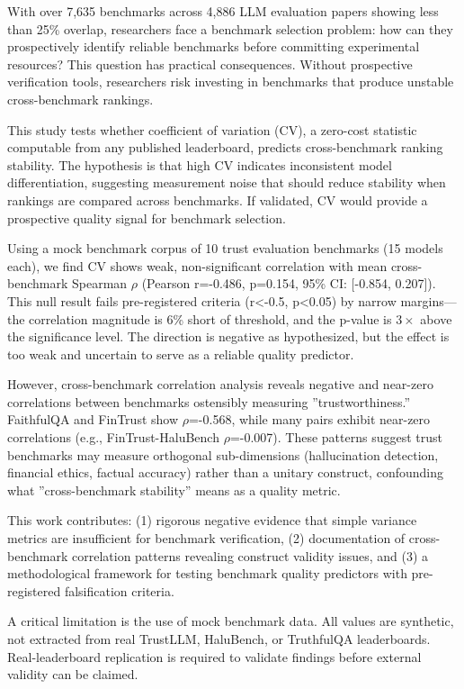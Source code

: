 
With over 7,635 benchmarks across 4,886 LLM evaluation papers showing less than 25\% overlap, researchers face a benchmark selection problem: how can they prospectively identify reliable benchmarks before committing experimental resources? This question has practical consequences. Without prospective verification tools, researchers risk investing in benchmarks that produce unstable cross-benchmark rankings.

This study tests whether coefficient of variation (CV), a zero-cost statistic computable from any published leaderboard, predicts cross-benchmark ranking stability. The hypothesis is that high CV indicates inconsistent model differentiation, suggesting measurement noise that should reduce stability when rankings are compared across benchmarks. If validated, CV would provide a prospective quality signal for benchmark selection.

Using a mock benchmark corpus of 10 trust evaluation benchmarks (15 models each), we find CV shows weak, non-significant correlation with mean cross-benchmark Spearman $\rho$ (Pearson r=-0.486, p=0.154, 95\% CI: [-0.854, 0.207]). This null result fails pre-registered criteria (r<-0.5, p<0.05) by narrow margins---the correlation magnitude is 6\% short of threshold, and the p-value is $3\times$ above the significance level. The direction is negative as hypothesized, but the effect is too weak and uncertain to serve as a reliable quality predictor.

However, cross-benchmark correlation analysis reveals negative and near-zero correlations between benchmarks ostensibly measuring ''trustworthiness.'' FaithfulQA and FinTrust show $\rho$=-0.568, while many pairs exhibit near-zero correlations (e.g., FinTrust-HaluBench $\rho$=-0.007). These patterns suggest trust benchmarks may measure orthogonal sub-dimensions (hallucination detection, financial ethics, factual accuracy) rather than a unitary construct, confounding what ''cross-benchmark stability'' means as a quality metric.

This work contributes: (1) rigorous negative evidence that simple variance metrics are insufficient for benchmark verification, (2) documentation of cross-benchmark correlation patterns revealing construct validity issues, and (3) a methodological framework for testing benchmark quality predictors with pre-registered falsification criteria.

A critical limitation is the use of mock benchmark data. All values are synthetic, not extracted from real TrustLLM, HaluBench, or TruthfulQA leaderboards. Real-leaderboard replication is required to validate findings before external validity can be claimed.

